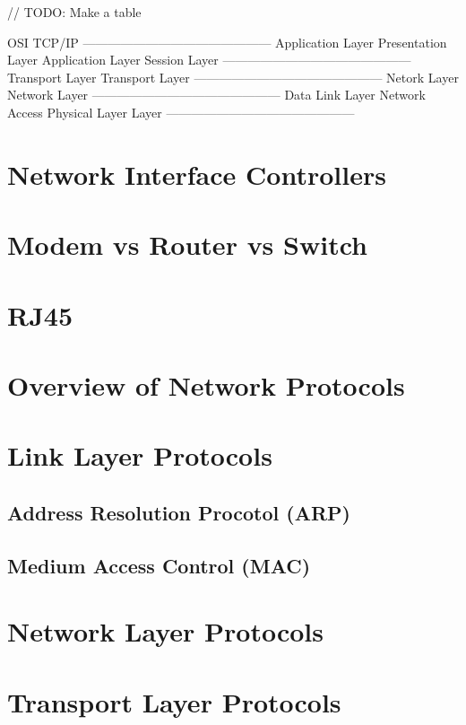 \documentclass{article}
\begin{document}
// TODO: Make a table

OSI                             TCP/IP
---------------------------------------------
Application Layer
Presentation Layer          Application Layer
Session Layer
---------------------------------------------
Transport Layer             Transport Layer
---------------------------------------------
Netork Layer                Network Layer
---------------------------------------------
Data Link Layer             Network Access
Physical Layer              Layer
---------------------------------------------

\section{Network Interface Controllers}

\section{Modem vs Router vs Switch}

\section{RJ45}

\section{Overview of Network Protocols}

\section{Link Layer Protocols}

\subsection{Address Resolution Procotol (ARP)}

\subsection{Medium Access Control (MAC)}

\section{Network Layer Protocols}

\section{Transport Layer Protocols}
\end{document}

